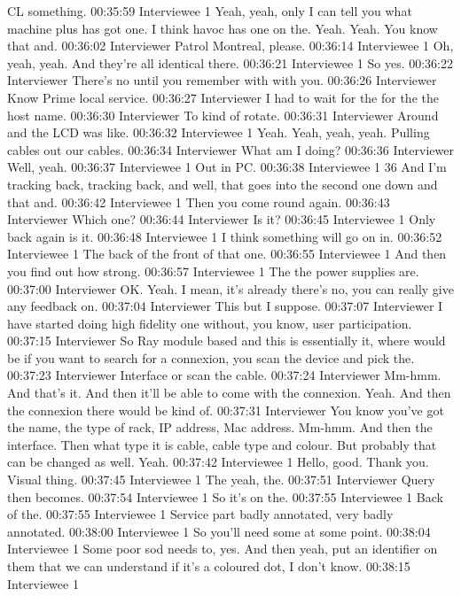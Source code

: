 CL something.
00:35:59 Interviewee 1
Yeah, yeah, only I can tell you what machine plus has got one. I think havoc has one on the. Yeah. Yeah. You know that and.
00:36:02 Interviewer
Patrol Montreal, please.
00:36:14 Interviewee 1
Oh, yeah, yeah. And they're all identical there.
00:36:21 Interviewee 1
So yes.
00:36:22 Interviewer
There's no until you remember with with you.
00:36:26 Interviewer
Know Prime local service.
00:36:27 Interviewer
I had to wait for the for the the host name.
00:36:30 Interviewer
To kind of rotate.
00:36:31 Interviewer
Around and the LCD was like.
00:36:32 Interviewee 1
Yeah. Yeah, yeah, yeah. Pulling cables out our cables.
00:36:34 Interviewer
What am I doing?
00:36:36 Interviewer
Well, yeah.
00:36:37 Interviewee 1
Out in PC.
00:36:38 Interviewee 1
36 And I'm tracking back, tracking back, and well, that goes into the second one down and that and.
00:36:42 Interviewee 1
Then you come round again.
00:36:43 Interviewer
Which one?
00:36:44 Interviewer
Is it?
00:36:45 Interviewee 1
Only back again is it.
00:36:48 Interviewee 1
I think something will go on in.
00:36:52 Interviewee 1
The back of the front of that one.
00:36:55 Interviewee 1
And then you find out how strong.
00:36:57 Interviewee 1
The the power supplies are.
00:37:00 Interviewer
OK. Yeah. I mean, it's already there's no, you can really give any feedback on.
00:37:04 Interviewer
This but I suppose.
00:37:07 Interviewer
I have started doing high fidelity one without, you know, user participation.
00:37:15 Interviewer
So Ray module based and this is essentially it, where would be if you want to search for a connexion, you scan the device and pick the.
00:37:23 Interviewer
Interface or scan the cable.
00:37:24 Interviewer
Mm-hmm. And that's it. And then it'll be able to come with the connexion. Yeah. And then the connexion there would be kind of.
00:37:31 Interviewer
You know you've got the name, the type of rack, IP address, Mac address. Mm-hmm. And then the interface. Then what type it is cable, cable type and colour. But probably that can be changed as well. Yeah.
00:37:42 Interviewee 1
Hello, good. Thank you. Visual thing.
00:37:45 Interviewee 1
The yeah, the.
00:37:51 Interviewer
Query then becomes.
00:37:54 Interviewee 1
So it's on the.
00:37:55 Interviewee 1
Back of the.
00:37:55 Interviewee 1
Service part badly annotated, very badly annotated.
00:38:00 Interviewee 1
So you'll need some at some point.
00:38:04 Interviewee 1
Some poor sod needs to, yes. And then yeah, put an identifier on them that we can understand if it's a coloured dot, I don't know.
00:38:15 Interviewee 1

